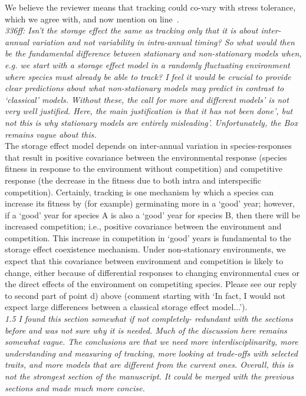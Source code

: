 \documentclass[11pt]{article}
\newcommand{\lr}[1]{line~\lineref{#1}}
\begin{document}
We believe the reviewer means that tracking could co-vary with stress tolerance, which we agree with, and now mention on \lr{r1stress}.\\

\emph{336ff: Isn't the storage effect the same as tracking only that it is about inter-annual
variation and not variability in intra-annual timing? So what would then be the fundamental
difference between stationary and non-stationary models when, e.g. we start with a storage
effect model in a randomly fluctuating environment where species must already be able to
track? I feel it would be crucial to provide clear predictions about what non-stationary
models may predict in contrast to  `classical' models. Without these, the call for more and
different models' is not very well justified. Here, the main justification is that it has
not been done', but not this is why stationary models are entirely misleading'.
Unfortunately, the Box remains vague about this.}\\

 The storage effect model depends on inter-annual variation in species-responses that result in positive covariance between the environmental response (species fitness in response to the environment without competition) and competitive response (the decrease in the fitness due to both intra and interspecific competition).  Certainly, tracking is one mechanism by which a species can increase its fitness by (for example) germinating more in a `good' year; however, if a `good' year for species A is also a `good' year for species B, then there will be increased competition; i.e., positive covariance between the environment and competition.  This increase in competition in `good' years is fundamental to the storage effect coexistence mechanism.  Under non-stationary environments, we expect that this covariance between environment and competition is likely to change, either because of differential responses to changing environmental cues or the direct effects of the environment on competiting species.   Please see our reply to second part of point d) above (comment starting with `In fact, I would not expect large differences between a classical storage effect model...').\\

\emph{1.5 I found this section somewhat if not completely- redundant with the sections before and
was not sure why it is needed. Much of the discussion here remains somewhat vague. The
conclusions are that we need more interdisciplinarity, more understanding and measuring of
tracking, more looking at trade-offs with selected traits, and more models that are different
from the current ones. Overall, this is not the strongest section of the manuscript. It could
be merged with the previous sections and made much more concise.}\\
\end{document}

